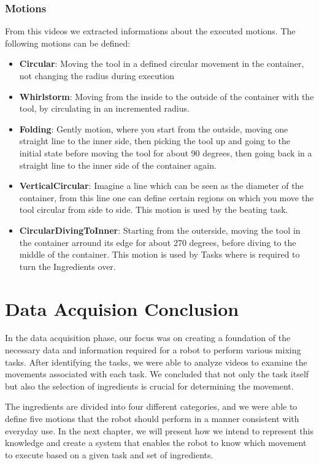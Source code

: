 \subsubsection*{Motions}
	From this videos we extracted informations about the executed motions. The following motions can be defined:
	\begin{itemize}
		\item \textbf{Circular}: Moving the tool in a defined circular movement in the container, not changing the radius during execution
		\item \textbf{Whirlstorm}: Moving from the inside to the outside of the container with the tool, by circulating in an incremented radius.
		\item \textbf{Folding}: Gently motion, where you start from the outside, moving one straight line to the inner side, then picking the tool up and going to the initial state before moving the tool for about 90 degrees, then going back in a straight line to the inner side of the container again.
		\item \textbf{VerticalCircular}: Imagine a line which can be seen as the diameter of the container, from this line one can define certain regions on which you move the tool circular from side to side. This motion is used by the beating task.
		\item \textbf{CircularDivingToInner}: Starting from the outerside, moving the tool in the container arround its edge for about 270 degrees, before diving to the middle of the container. This motion is used by Tasks where is required to turn the Ingredients over.
	\end{itemize}

\section*{Data Acquision Conclusion}

In the data acquisition phase, our focus was on creating a foundation of the necessary data and information required for a robot to perform various mixing tasks. After identifying the tasks, we were able to analyze videos to examine the movements associated with each task. We concluded that not only the task itself but also the selection of ingredients is crucial for determining the movement.

The ingredients are divided into four different categories, and we were able to define five motions that the robot should perform in a manner consistent with everyday use. In the next chapter, we will present how we intend to represent this knowledge and create a system that enables the robot to know which movement to execute based on a given task and set of ingredients.
\newpage